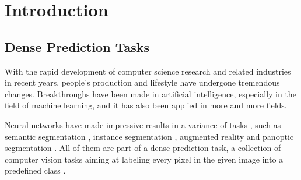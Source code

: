 \section{Introduction}
\subsection{Dense Prediction Tasks} 
With the rapid development of computer science research and related industries in recent years, people's production and lifestyle have undergone tremendous changes. Breakthroughs have been made in artificial intelligence, especially in the field of machine learning, and it has also been applied in more and more fields.

Neural networks have made impressive results in a variance of tasks \cite{multivandenhende2021}, such as semantic segmentation \cite{long2015fully}, instance segmentation \cite{he2017mask}, augmented reality \cite{abu2018augmented} and panoptic segmentation \cite{kirillov2019panoptic}. All of them are part of a dense prediction task, a collection of computer vision tasks aiming at labeling every pixel in the given image into a predefined class \cite{huang2021fapn}.


